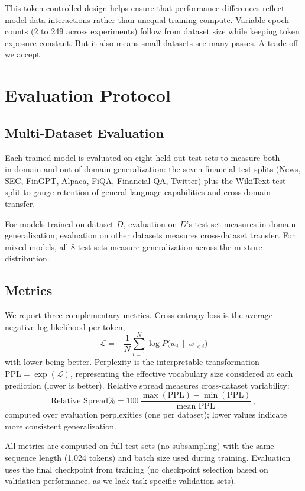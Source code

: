 This token controlled design helps ensure that performance differences reflect model data interactions rather than unequal training compute. Variable epoch counts (2 to 249 across experiments) follow from dataset size while keeping token exposure constant. But it also means small datasets see many passes. A trade off we accept.

\section{Evaluation Protocol}

\subsection{Multi-Dataset Evaluation}

Each trained model is evaluated on eight held‑out test sets to measure both in‑domain and out‑of‑domain generalization: the seven financial test splits (News, SEC, FinGPT, Alpaca, FiQA, Financial QA, Twitter) plus the WikiText test split to gauge retention of general language capabilities and cross‑domain transfer.

For models trained on dataset $D$, evaluation on $D$'s test set measures in-domain generalization; evaluation on other datasets measures cross-dataset transfer. For mixed models, all 8 test sets measure generalization across the mixture distribution.

\subsection{Metrics}

We report three complementary metrics. Cross‑entropy loss is the average negative log‑likelihood per token,
\begin{equation*}
    \mathcal{L} = -\frac{1}{N}\sum_{i=1}^{N} \log P\bigl(w_i \,\mid\, w_{<i}\bigr)
\end{equation*}
with lower being better. Perplexity is the interpretable transformation $\text{PPL}=\exp(\mathcal{L})$, representing the effective vocabulary size considered at each prediction (lower is better). Relative spread measures cross‑dataset variability:
\begin{equation*}
    \text{Relative Spread}\% = 100\,\frac{\max(\text{PPL}) - \min(\text{PPL})}{\text{mean PPL}}\, ,
\end{equation*}
computed over evaluation perplexities (one per dataset); lower values indicate more consistent generalization.

All metrics are computed on full test sets (no subsampling) with the same sequence length (1,024 tokens) and batch size used during training. Evaluation uses the final checkpoint from training (no checkpoint selection based on validation performance, as we lack task-specific validation sets).
